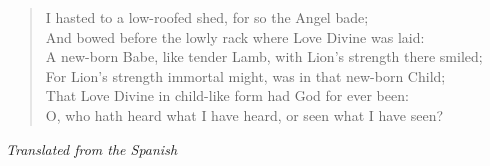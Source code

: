 \begin{verse}
I hasted to a low-roofed shed, for so the Angel bade;\\
And bowed before the lowly rack where Love Divine was laid:\\
A new-born Babe, like tender Lamb, with Lion's strength there smiled;\\
For Lion's strength immortal might, was in that new-born Child;\\
That Love Divine in child-like form had God for ever been:\\
O, who hath heard what I have heard, or seen what I have seen?%
\end{verse}

\vspace{0.5\baselineskip}
\noindent\textit{Translated from the Spanish}

\newpage
